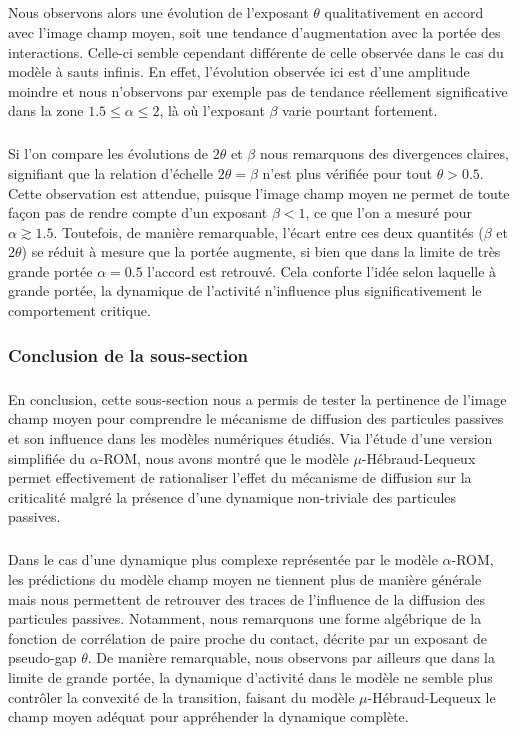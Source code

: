 \subparagraph{}Nous observons alors une évolution de l'exposant $\theta$ qualitativement en accord avec l'image champ moyen, soit une tendance d'augmentation avec la portée des interactions. Celle-ci semble cependant différente de celle observée dans le cas du modèle à sauts infinis. En effet, l'évolution observée ici est d'une amplitude moindre et nous n'observons par exemple pas de tendance réellement significative dans la zone $1.5 \leq \alpha \leq 2$, là où l'exposant $\beta$ varie pourtant fortement.

\subparagraph{}Si l'on compare les évolutions de $2\theta$ et $\beta$ nous remarquons des divergences claires, signifiant que la relation d'échelle $2\theta = \beta$ n'est plus vérifiée pour tout $\theta > 0.5$. Cette observation est attendue, puisque l'image champ moyen ne permet de toute façon pas de rendre compte d'un exposant $\beta < 1$, ce que l'on a mesuré pour $\alpha \gtrsim 1.5$. Toutefois, de manière remarquable, l'écart entre ces deux quantités ($\beta$ et $2\theta$) se réduit à mesure que la portée augmente, si bien que dans la limite de très grande portée $\alpha = 0.5$ l'accord est retrouvé. Cela conforte l'idée selon laquelle à grande portée, la dynamique de l'activité n'influence plus significativement le comportement critique.

\subsubsection{Conclusion de la sous-section}

\subparagraph{}En conclusion, cette sous-section nous a permis de tester la pertinence de l'image champ moyen pour comprendre le mécanisme de diffusion des particules passives et son influence dans les modèles numériques étudiés. Via l'étude d'une version simplifiée du $\alpha$-ROM, nous avons montré que le modèle $\mu$-Hébraud-Lequeux permet effectivement de rationaliser l'effet du mécanisme de diffusion sur la criticalité malgré la présence d'une dynamique non-triviale des particules passives. 

\subparagraph{}Dans le cas d'une dynamique plus complexe représentée par le modèle $\alpha$-ROM, les prédictions du modèle champ moyen ne tiennent plus de manière générale mais nous permettent de retrouver des traces de l'influence de la diffusion des particules passives. Notamment, nous remarquons une forme algébrique de la fonction de corrélation de paire proche du contact, décrite par un exposant de pseudo-gap $\theta$. De manière remarquable, nous observons par ailleurs que dans la limite de grande portée, la dynamique d'activité dans le modèle ne semble plus contrôler la convexité de la transition, faisant du modèle $\mu$-Hébraud-Lequeux le champ moyen adéquat pour appréhender la dynamique complète.

